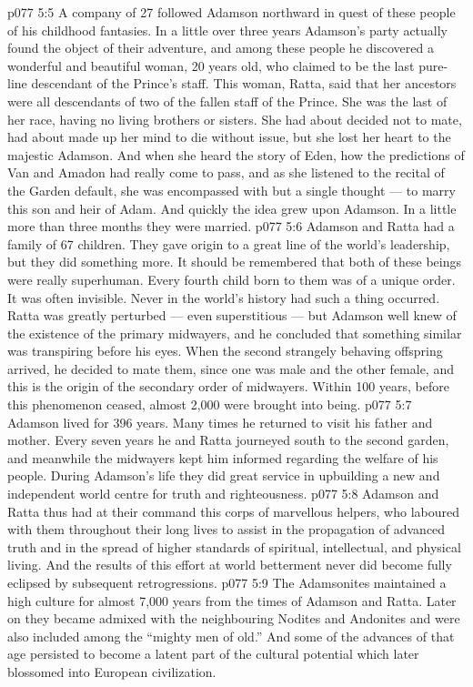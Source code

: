 \vs p077 5:5 A company of 27 followed Adamson northward in quest of these people of his childhood fantasies. In a little over three years Adamson’s party actually found the object of their adventure, and among these people he discovered a wonderful and beautiful woman, 20 years old, who claimed to be the last pure\hyp{}line descendant of the Prince’s staff. This woman, Ratta, said that her ancestors were all descendants of two of the fallen staff of the Prince. She was the last of her race, having no living brothers or sisters. She had about decided not to mate, had about made up her mind to die without issue, but she lost her heart to the majestic Adamson. And when she heard the story of Eden, how the predictions of Van and Amadon had really come to pass, and as she listened to the recital of the Garden default, she was encompassed with but a single thought --- to marry this son and heir of Adam. And quickly the idea grew upon Adamson. In a little more than three months they were married.
\vs p077 5:6 \pc Adamson and Ratta had a family of 67 children. They gave origin to a great line of the world’s leadership, but they did something more. It should be remembered that both of these beings were really superhuman. Every fourth child born to them was of a unique order. It was often invisible. Never in the world’s history had such a thing occurred. Ratta was greatly perturbed --- even superstitious --- but Adamson well knew of the existence of the primary midwayers, and he concluded that something similar was transpiring before his eyes. When the second strangely behaving offspring arrived, he decided to mate them, since one was male and the other female, and this is the origin of the secondary order of midwayers. Within 100 years, before this phenomenon ceased, almost 2,000 were brought into being.
\vs p077 5:7 \pc Adamson lived for 396 years. Many times he returned to visit his father and mother. Every seven years he and Ratta journeyed south to the second garden, and meanwhile the midwayers kept him informed regarding the welfare of his people. During Adamson’s life they did great service in upbuilding a new and independent world centre for truth and righteousness.
\vs p077 5:8 Adamson and Ratta thus had at their command this corps of marvellous helpers, who laboured with them throughout their long lives to assist in the propagation of advanced truth and in the spread of higher standards of spiritual, intellectual, and physical living. And the results of this effort at world betterment never did become fully eclipsed by subsequent retrogressions.
\vs p077 5:9 \pc The Adamsonites maintained a high culture for almost 7,000 years from the times of Adamson and Ratta. Later on they became admixed with the neighbouring Nodites and Andonites and were also included among the “mighty men of old.” And some of the advances of that age persisted to become a latent part of the cultural potential which later blossomed into European civilization.
